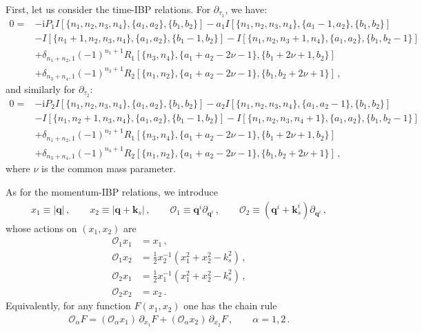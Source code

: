 \documentclass[%
 reprint,
 amsmath,amssymb,
 aps,
prd,
]{revtex4-2}
\def\pd{\partial}
\def\ii{\mathrm{i}}
\begin{document}
\begin{widetext}
First, let us consider the time-IBP relations. For $\pd_{\tau_1}$, we have:
\begin{align}
	0 = & - \ii P_1 I[\{n_1,n_2,n_3,n_4\},\{a_1,a_2\},\{b_1,b_2\}] - a_1I[\{n_1,n_2,n_3,n_4\},\{a_1-1,a_2\},\{b_1,b_2\}]\nonumber \\
	    & - I[\{n_1+1,n_2,n_3,n_4\},\{a_1,a_2\},\{b_1-1,b_2\}] - I[\{n_1,n_2,n_3+1,n_4\},\{a_1,a_2\},\{b_1,b_2-1\}]\nonumber      \\
	    & +\delta_{n_1+n_2,1}(-1)^{n_1+1}R_1[\{n_3,n_4\},\{a_1+a_2-2\nu-1\},\{b_1+2\nu+1,b_2\}]\nonumber                \\
	    & +\delta_{n_3+n_4,1}(-1)^{n_3+1}R_2[\{n_1,n_2\},\{a_1+a_2-2\nu-1\},\{b_1,b_2+2\nu+1\}]\,, \label{eq:timeIBP_tau1}
\end{align}
and similarly for $\partial_{\tau_2}$:
\begin{align}
	0 = & - \ii P_2 I[\{n_1,n_2,n_3,n_4\},\{a_1,a_2\},\{b_1,b_2\}] - a_2I[\{n_1,n_2,n_3,n_4\},\{a_1,a_2-1\},\{b_1,b_2\}]\nonumber \\
	    & - I[\{n_1,n_2+1,n_3,n_4\},\{a_1,a_2\},\{b_1-1,b_2\}] - I[\{n_1,n_2,n_3,n_4+1\},\{a_1,a_2\},\{b_1,b_2-1\}]\nonumber      \\
	    & +\delta_{n_1+n_2,1}(-1)^{n_2+1}R_1[\{n_3,n_4\},\{a_1+a_2-2\nu-1\},\{b_1+2\nu+1,b_2\}]\nonumber                \\
	    & +\delta_{n_3+n_4,1}(-1)^{n_4+1}R_2[\{n_1,n_2\},\{a_1+a_2-2\nu-1\},\{b_1,b_2+2\nu+1\}]\,, \label{eq:timeIBP_tau2}
\end{align}
where $\nu$ is the common mass parameter.

As for the momentum-IBP relations, we introduce
\begin{align}
	x_1 \equiv |\bm q|\,,\qquad x_2 \equiv |\bm q+\bm k_s|\,,\qquad
	\mathcal{O}_1 \equiv \bm q^i \pd_{\bm q^i}\,,\qquad
	\mathcal{O}_2 \equiv (\bm q^i+\bm k_s^i)\pd_{\bm q^i}\,,
\end{align}
whose actions on $(x_1,x_2)$ are
\begin{align}
	\mathcal{O}_1 x_1 & = x_1\,, \nonumber\\
	\mathcal{O}_1 x_2 & = \frac{1}{2}x_2^{-1}(x_1^2 + x_2^2 - k_s^2)\,, \nonumber\\
	\mathcal{O}_2 x_1 & = \frac{1}{2}x_1^{-1}(x_1^2 + x_2^2 - k_s^2)\,, \nonumber\\
	\mathcal{O}_2 x_2 & = x_2\,.
\end{align}
Equivalently, for any function $F(x_1,x_2)$ one has the chain rule
\begin{align}
	\mathcal{O}_\alpha F = (\mathcal{O}_\alpha x_1)\,\partial_{x_1}F + (\mathcal{O}_\alpha x_2)\,\partial_{x_2}F\,,\qquad \alpha=1,2\,.
\end{align}


\end{widetext}
\end{document}
